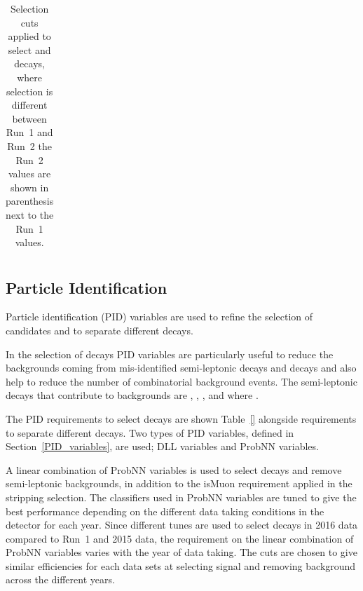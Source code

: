 \begin{table}[htbp]
\begin{center}
\begin{tabular}{lll}
\hline

\hline
\end{tabular}
\vspace{0.7cm}
\caption{Selection cuts applied to select \bsmumu and \bhh decays, where selection is different between Run~1 and Run~2 the Run~2 values are shown in parenthesis next to the Run~1 values.}
\label{tab:fullpreselection}
\end{center}
\end{table}



\subsection{Particle Identification}
\label{sec:PID}
Particle identification (PID) variables are used to refine the selection of \bmumu candidates and to separate different \bhh decays. 

In the selection of \bmumu decays PID variables are particularly useful to reduce the backgrounds coming from mis-identified semi-leptonic decays and \bhh decays and also help to reduce the number of combinatorial background events. The semi-leptonic decays that contribute to \bsmumu backgrounds are \bdpimunu, \bsKmunu, \bpimumu, \bdpimumu and \bcjpsimunu where \jpsimumu.

The PID requirements to select \bmumu decays are shown Table~\ref{} alongside requirements to separate different \bhh decays. Two types of PID variables, defined in Section~\ref{PID_variables}, are used; DLL variables and ProbNN variables. 

A linear combination of ProbNN variables is used to select \bsmumu decays and remove semi-leptonic backgrounds, in addition to the isMuon requirement applied in the stripping selection.
The classifiers used in ProbNN variables are tuned to give the best performance depending on the different data taking conditions in the detector for each year. %
Since different tunes are used to select \bsmumu decays in 2016 data compared to Run~1 and 2015 data, the requirement on the linear combination of ProbNN variables varies with the year of data taking. The cuts are chosen to give similar efficiencies for each data sets at selecting signal and removing background across the different years. 



